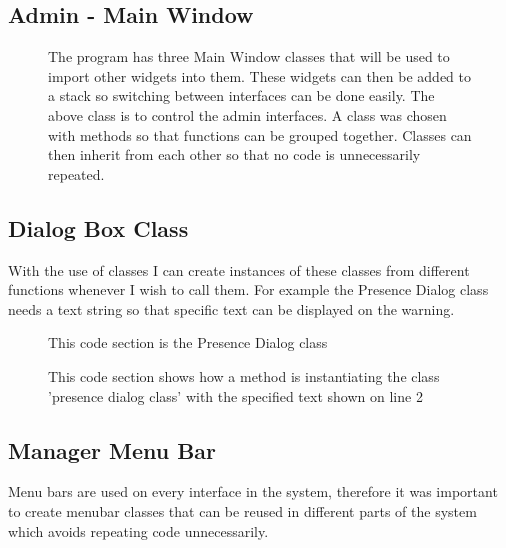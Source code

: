 \subsection{Admin - Main Window}
\begin{figure}[H]
    \caption{The program has three Main Window classes that will be used to import other widgets into them. These widgets can then be added to a stack so switching between interfaces can be done easily. The above class is to control the admin interfaces. A class was chosen with methods so that functions can be grouped together. Classes can then inherit from each other so that no code is unnecessarily repeated.} \label{fig:MainWindowAdmin}
\end{figure}

\newpage

\subsection{Dialog Box Class}
With the use of classes I can create instances of these classes from different functions whenever I wish to call them. For example the Presence Dialog class needs a text string so that specific text can be displayed on the warning.
\begin{figure}[H]
    \caption{This code section is the Presence Dialog class} \label{fig:Dialog Class}
\end{figure}

\begin{figure}[H]
    \caption{This code section shows how a method is instantiating the class 'presence dialog class' with the specified text shown on line 2} \label{fig:Dialog Class}
\end{figure}

\subsection{Manager Menu Bar}

Menu bars are used on every interface in the system, therefore it was important to create menubar classes that can be reused in different parts of the system which avoids repeating code unnecessarily.  

